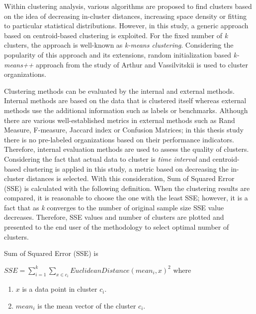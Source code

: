Within clustering analysis, various algorithms are proposed to find clusters based on the idea of decreasing in-cluster distances, increasing space density or fitting to particular statistical distributions. However, in this study, a generic approach based on centroid-based clustering is exploited. For the fixed number of \textit{k} clusters, the approach is well-known as \textit{k-means clustering}. Considering the popularity of this approach and its extensions, random initialization based \textit{k-means++} approach from the study of Arthur and Vassilvitskii \cite{arthur2007} is used to cluster organizations. 

Clustering methods can be evaluated by the internal and external methods. Internal methods are based on the data that is clustered itself whereas external methods use the additional information such as labels or benchmarks. Although there are various well-established metrics in external methods such as Rand Measure, F-measure, Jaccard index or Confusion Matrices; in this thesis study there is no pre-labeled organizations based on their performance indicators. Therefore, internal evaluation methods are used to assess the quality of clusters. Considering the fact that actual data to cluster is \textit{time interval} and centroid-based clustering is applied in this study, a metric based on decreasing the in-cluster distances is selected. With this consideration, Sum of Squared Error (SSE) is calculated with the following definition. When the clustering results are compared, it is reasonable to choose the one with the least SSE; however, it is a fact that as \textit{k} converges to the number of original sample size SSE value decreases. Therefore, SSE values and number of clusters are plotted and presented to the end user of the methodology to select optimal number of clusters.

\theoremstyle{definition}
\begin{definition}
Sum of Squared Error (SSE) is

$SSE = \sum_{i=1}^{k} \sum_{x \in c_{i}} EuclideanDistance(mean_{i}, x)^{2}$ where
\begin{enumerate}
  \item $x$ is a data point in cluster $c_{i}$.
  \item $mean_{i}$ is the mean vector of the cluster $c_{i}$.
\end{enumerate}
\end{definition}

